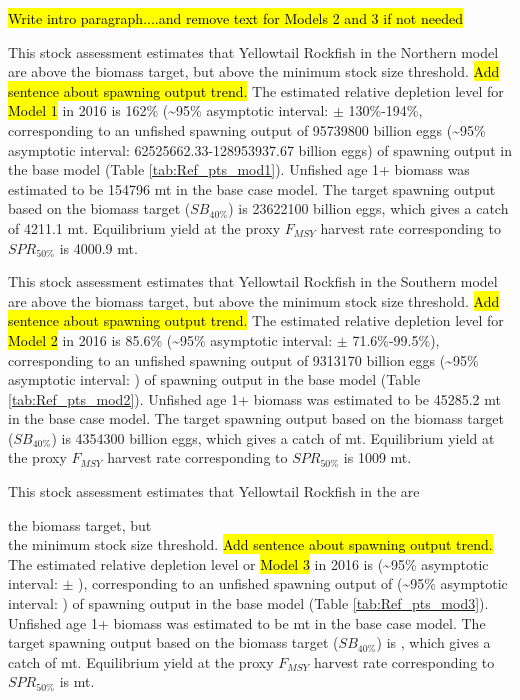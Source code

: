 \documentclass[12pt,]{article}
\begin{document}
\hl{Write intro paragraph....and remove text for Models 2 and 3 if not needed}

This stock assessment estimates that Yellowtail Rockfish in the Northern
model are above the biomass target, but above the minimum stock size
threshold. \hl{Add sentence about spawning output trend.} The estimated
relative depletion level for \hl{Model 1} in 2016 is 162\%
(\textasciitilde{}95\% asymptotic interval: \(\pm\) 130\%-194\%,
corresponding to an unfished spawning output of 95739800 billion eggs
(\textasciitilde{}95\% asymptotic interval: 62525662.33-128953937.67
billion eggs) of spawning output in the base model (Table
\ref{tab:Ref_pts_mod1}). Unfished age 1+ biomass was estimated to be
154796 mt in the base case model. The target spawning output based on
the biomass target (\(SB_{40\%}\)) is 23622100 billion eggs, which gives
a catch of 4211.1 mt. Equilibrium yield at the proxy \(F_{MSY}\) harvest
rate corresponding to \(SPR_{50\%}\) is 4000.9 mt.

This stock assessment estimates that Yellowtail Rockfish in the Southern
model are above the biomass target, but above the minimum stock size
threshold. \hl{Add sentence about spawning output trend.} The estimated
relative depletion level for \hl{Model 2} in 2016 is 85.6\%
(\textasciitilde{}95\% asymptotic interval: \(\pm\) 71.6\%-99.5\%),
corresponding to an unfished spawning output of 9313170 billion eggs
(\textasciitilde{}95\% asymptotic interval: ) of spawning output in the
base model (Table \ref{tab:Ref_pts_mod2}). Unfished age 1+ biomass was
estimated to be 45285.2 mt in the base case model. The target spawning
output based on the biomass target (\(SB_{40\%}\)) is 4354300 billion
eggs, which gives a catch of mt. Equilibrium yield at the proxy
\(F_{MSY}\) harvest rate corresponding to \(SPR_{50\%}\) is 1009 mt.

This stock assessment estimates that Yellowtail Rockfish in the are

the biomass target, but\\
the minimum stock size threshold.
\hl{Add sentence about spawning output trend.} The estimated relative
depletion level or \hl{Model 3} in 2016 is (\textasciitilde{}95\%
asymptotic interval: \(\pm\) ), corresponding to an unfished spawning
output of (\textasciitilde{}95\% asymptotic interval: ) of spawning
output in the base model (Table \ref{tab:Ref_pts_mod3}). Unfished age 1+
biomass was estimated to be mt in the base case model. The target
spawning output based on the biomass target (\(SB_{40\%}\)) is , which
gives a catch of mt. Equilibrium yield at the proxy \(F_{MSY}\) harvest
rate corresponding to \(SPR_{50\%}\) is mt.
\end{document}
